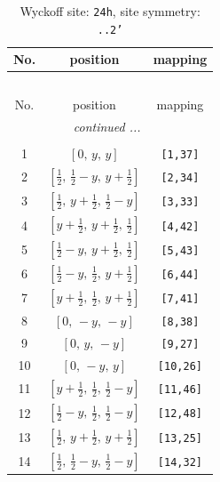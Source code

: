 \documentclass[fleqn,8pt]{jsarticle}
\begin{document}
\begin{longtable}{ccc}
\caption{Wyckoff site: {\tt 24h}, site symmetry: {\tt ..2'}}
 \\
 \hline \hline
No. & position & mapping \\ \hline \endfirsthead

\multicolumn{2}{l}{\tablename\ \thetable{}} \\
 \hline \hline
No. & position & mapping \\ \hline \endhead

 \hline \hline
\multicolumn{2}{r}{\footnotesize\it continued ...} \\ \endfoot

 \hline \hline
\multicolumn{2}{r}{} \\ \endlastfoot

1 & $\left[ 0,\, y,\, y \right]$ & {\tt [1,37]} \\ \hline
2 & $\left[ \frac{1}{2},\, \frac{1}{2} - y,\, y + \frac{1}{2} \right]$ & {\tt [2,34]} \\ \hline
3 & $\left[ \frac{1}{2},\, y + \frac{1}{2},\, \frac{1}{2} - y \right]$ & {\tt [3,33]} \\ \hline
4 & $\left[ y + \frac{1}{2},\, y + \frac{1}{2},\, \frac{1}{2} \right]$ & {\tt [4,42]} \\ \hline
5 & $\left[ \frac{1}{2} - y,\, y + \frac{1}{2},\, \frac{1}{2} \right]$ & {\tt [5,43]} \\ \hline
6 & $\left[ \frac{1}{2} - y,\, \frac{1}{2},\, y + \frac{1}{2} \right]$ & {\tt [6,44]} \\ \hline
7 & $\left[ y + \frac{1}{2},\, \frac{1}{2},\, y + \frac{1}{2} \right]$ & {\tt [7,41]} \\ \hline
8 & $\left[ 0,\, - y,\, - y \right]$ & {\tt [8,38]} \\ \hline
9 & $\left[ 0,\, y,\, - y \right]$ & {\tt [9,27]} \\ \hline
10 & $\left[ 0,\, - y,\, y \right]$ & {\tt [10,26]} \\ \hline
11 & $\left[ y + \frac{1}{2},\, \frac{1}{2},\, \frac{1}{2} - y \right]$ & {\tt [11,46]} \\ \hline
12 & $\left[ \frac{1}{2} - y,\, \frac{1}{2},\, \frac{1}{2} - y \right]$ & {\tt [12,48]} \\ \hline
13 & $\left[ \frac{1}{2},\, y + \frac{1}{2},\, y + \frac{1}{2} \right]$ & {\tt [13,25]} \\ \hline
14 & $\left[ \frac{1}{2},\, \frac{1}{2} - y,\, \frac{1}{2} - y \right]$ & {\tt [14,32]} \\ \hline

\end{longtable}
\end{document}
